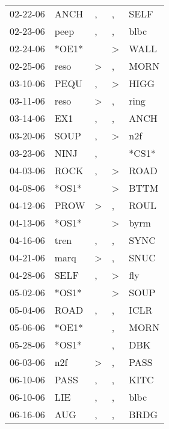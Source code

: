 \begin{supertabular}{lllll}
 02-22-06 &   ANCH &             , &                , &   SELF \\
 02-23-06 &   peep &             , &                , &   blbc \\
 02-24-06 &  *OE1* &               &     \textgreater &   WALL \\
 02-25-06 &   reso &  \textgreater &                , &   MORN \\
 03-10-06 &   PEQU &             , &     \textgreater &   HIGG \\
 03-11-06 &   reso &  \textgreater &                , &   ring \\
 03-14-06 &    EX1 &             , &                , &   ANCH \\
 03-20-06 &   SOUP &             , &     \textgreater &    n2f \\
 03-23-06 &   NINJ &             , &                  &  *CS1* \\
 04-03-06 &   ROCK &             , &     \textgreater &   ROAD \\
 04-08-06 &  *OS1* &               &     \textgreater &   BTTM \\
 04-12-06 &   PROW &  \textgreater &                , &   ROUL \\
 04-13-06 &  *OS1* &               &     \textgreater &   byrm \\
 04-16-06 &   tren &             , &                , &   SYNC \\
 04-21-06 &   marq &  \textgreater &                , &   SNUC \\
 04-28-06 &   SELF &             , &     \textgreater &    fly \\
 05-02-06 &  *OS1* &               &     \textgreater &   SOUP \\
 05-04-06 &   ROAD &             , &                , &   ICLR \\
 05-06-06 &  *OE1* &               &                , &   MORN \\
 05-28-06 &  *OS1* &               &                , &    DBK \\
 06-03-06 &    n2f &  \textgreater &                , &   PASS \\
 06-10-06 &   PASS &             , &                , &   KITC \\
 06-10-06 &    LIE &             , &                , &   blbc \\
 06-16-06 &    AUG &             , &                , &   BRDG \\

\end{supertabular}
